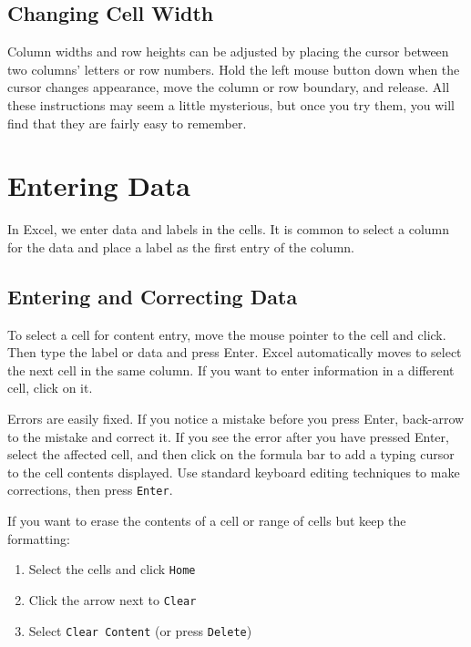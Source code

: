 \documentclass[
]{book}
\providecommand{\tightlist}{%
  \setlength{\itemsep}{0pt}\setlength{\parskip}{0pt}}
\begin{document}
\hypertarget{changing-cell-width}{%
\subsection{Changing Cell Width}\label{changing-cell-width}}

Column widths and row heights can be adjusted by placing the cursor between two columns' letters or row numbers. Hold the left mouse button down when the cursor changes appearance, move the column or row boundary, and release.
All these instructions may seem a little mysterious, but once you try them, you will find that they are fairly easy to remember.

\hypertarget{entering-data}{%
\section{Entering Data}\label{entering-data}}

In Excel, we enter data and labels in the cells. It is common to select a column for the data and place a label as the first entry of the column.

\hypertarget{entering-and-correcting-data}{%
\subsection{Entering and Correcting Data}\label{entering-and-correcting-data}}

To select a cell for content entry, move the mouse pointer to the cell and click. Then type the label or data and press Enter. Excel automatically moves to select the next cell in the same column. If you want to enter information in a different cell, click on it.

Errors are easily fixed. If you notice a mistake before you press Enter, back-arrow to the mistake and correct it. If you see the error after you have pressed Enter, select the affected cell, and then click on the formula bar to add a typing cursor to the cell contents displayed. Use standard keyboard editing techniques to make corrections, then press \texttt{Enter}.

If you want to erase the contents of a cell or range of cells but keep the formatting:

\begin{enumerate}
\def\labelenumi{\arabic{enumi}.}
\tightlist
\item
  Select the cells and click \texttt{Home}
\item
  Click the arrow next to \texttt{Clear}
\item
  Select \texttt{Clear\ Content} (or press \texttt{Delete})
\end{enumerate}
\end{document}
